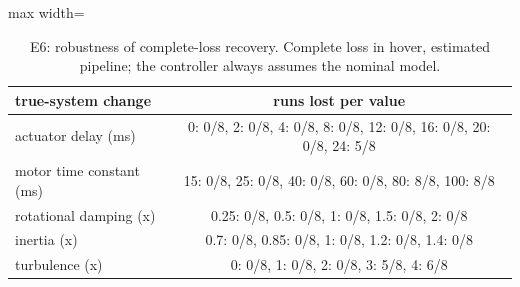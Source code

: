 \begin{table}[t]
\centering
\caption{E6: robustness of complete-loss recovery. Complete loss in hover, estimated pipeline; the controller always assumes the nominal model.}
\label{tab:e6}
\footnotesize
\setlength{\tabcolsep}{3pt}
\begin{adjustbox}{max width=\linewidth}
\begin{tabular}{lc}
\toprule
true-system change & runs lost per value \\
\midrule
actuator delay (ms) & 0: 0/8, 2: 0/8, 4: 0/8, 8: 0/8, 12: 0/8, 16: 0/8, 20: 0/8, 24: 5/8 \\
motor time constant (ms) & 15: 0/8, 25: 0/8, 40: 0/8, 60: 0/8, 80: 8/8, 100: 8/8 \\
rotational damping (x) & 0.25: 0/8, 0.5: 0/8, 1: 0/8, 1.5: 0/8, 2: 0/8 \\
inertia (x) & 0.7: 0/8, 0.85: 0/8, 1: 0/8, 1.2: 0/8, 1.4: 0/8 \\
turbulence (x) & 0: 0/8, 1: 0/8, 2: 0/8, 3: 5/8, 4: 6/8 \\
\bottomrule
\end{tabular}
\end{adjustbox}
\end{table}
